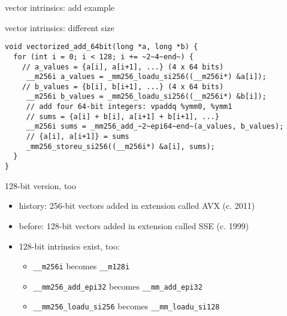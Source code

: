 \begin{frame}[fragile,label=intrSum]{vector intrinsics: add example}
\end{frame}

\begin{frame}[fragile,label=intrSizes]{vector intrinsics: different size}
\begin{lstlisting}
void vectorized_add_64bit(long *a, long *b) {
  for (int i = 0; i < 128; i += ~2~4~end~) {
    // a_values = {a[i], a[i+1], ...} (4 x 64 bits)
     __m256i a_values = _mm256_loadu_si256((__m256i*) &a[i]);
    // b_values = {b[i], b[i+1], ...} (4 x 64 bits)
     __m256i b_values = _mm256_loadu_si256((__m256i*) &b[i]);
     // add four 64-bit integers: vpaddq %ymm0, %ymm1
     // sums = {a[i] + b[i], a[i+1] + b[i+1], ...}
     __m256i sums = _mm256_add_~2~epi64~end~(a_values, b_values);
     // {a[i], a[i+1]} = sums
     _mm256_storeu_si256((__m256i*) &a[i], sums);
  }
}
\end{lstlisting}
\end{frame}

\begin{frame}[fragile,label=vect128]{128-bit version, too}
\begin{itemize}
\item history: 256-bit vectors added in extension called AVX (c. 2011)
\item before: 128-bit vectors added in extension called SSE (c. 1999)
\vspace{.5cm}
\item 128-bit intrinsics exist, too:
    \begin{itemize}
    \item \texttt{\_\_m256i} becomes \texttt{\_\_m128i}
    \item \texttt{\_\_mm256\_add\_epi32} becomes \texttt{\_\_mm\_add\_epi32}
    \item \texttt{\_\_mm256\_loadu\_si256} becomes \texttt{\_\_mm\_loadu\_si128}
    \end{itemize}
\end{itemize}
\end{frame}

